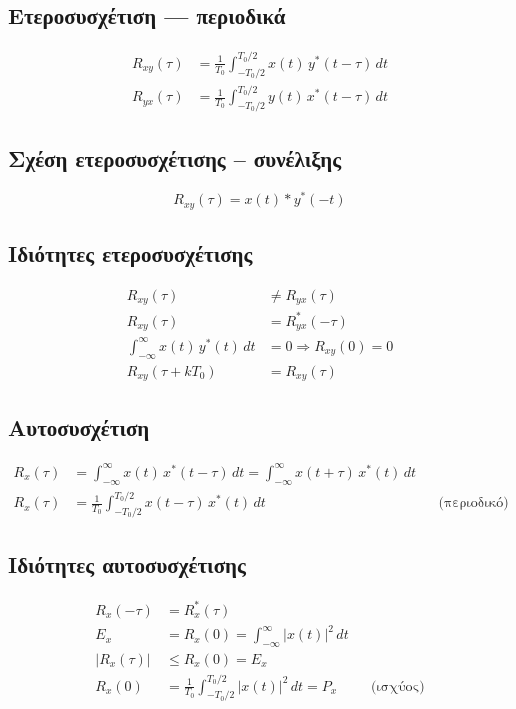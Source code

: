 \documentclass[11pt,a4paper]{article}
\begin{document}
\subsection{Ετεροσυσχέτιση — περιοδικά}
\begin{align}
R_{xy}(\tau) &= \frac{1}{T_0}\int_{-T_0/2}^{T_0/2} x(t)\,y^*(t-\tau)\,dt \\
R_{yx}(\tau) &= \frac{1}{T_0}\int_{-T_0/2}^{T_0/2} y(t)\,x^*(t-\tau)\,dt
\end{align}

\subsection{Σχέση ετεροσυσχέτισης -- συνέλιξης}
\begin{equation}
R_{xy}(\tau) = x(t) \ast y^*(-t)
\end{equation}

\subsection{Ιδιότητες ετεροσυσχέτισης}
\begin{align}
R_{xy}(\tau) &\neq R_{yx}(\tau) \\
R_{xy}(\tau) &= R_{yx}^*(-\tau) \\
\int_{-\infty}^{\infty} x(t)\,y^*(t)\,dt &= 0 \Rightarrow R_{xy}(0) = 0 \\
R_{xy}(\tau + kT_0) &= R_{xy}(\tau)
\end{align}

\subsection{Αυτοσυσχέτιση}
\begin{align}
R_x(\tau) &= \int_{-\infty}^{\infty} x(t)\,x^*(t-\tau)\,dt
           = \int_{-\infty}^{\infty} x(t+\tau)\,x^*(t)\,dt \\
R_x(\tau) &= \frac{1}{T_0}\int_{-T_0/2}^{T_0/2} x(t-\tau)\,x^*(t)\,dt && \text{(περιοδικό)}
\end{align}

\subsection{Ιδιότητες αυτοσυσχέτισης}
\begin{align}
R_x(-\tau) &= R_x^*(\tau) \\
E_x &= R_x(0) = \int_{-\infty}^{\infty} |x(t)|^2\,dt \\
|R_x(\tau)| &\le R_x(0) = E_x \\
R_x(0) &= \frac{1}{T_0}\int_{-T_0/2}^{T_0/2} |x(t)|^2\,dt = P_x && \text{(ισχύος)}
\end{align}
\end{document}
